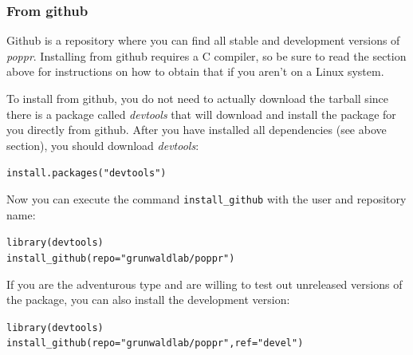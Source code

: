 \documentclass[letterpaper]{article}\usepackage[]{graphicx}\usepackage[]{color}
\makeatletter
\newcommand{\hlstr}[1]{\textcolor[rgb]{0.651,0.522,0}{#1}}%
\newcommand{\hlstd}[1]{\textcolor[rgb]{0,0,0}{#1}}%
\newcommand{\hlkwc}[1]{\textcolor[rgb]{0,0.502,0.753}{#1}}%
\newcommand{\hlkwd}[1]{\textcolor[rgb]{0,0.267,0.4}{#1}}%
\newenvironment{kframe}{%
 \def\at@end@of@kframe{}%
 \ifinner\ifhmode%
  \def\at@end@of@kframe{\end{minipage}}%
  \begin{minipage}{\columnwidth}%
 \fi\fi%
 \def\FrameCommand##1{\hskip\@totalleftmargin \hskip-\fboxsep
 \colorbox{shadecolor}{##1}\hskip-\fboxsep
     \hskip-\linewidth \hskip-\@totalleftmargin \hskip\columnwidth}%
 \MakeFramed {\advance\hsize-\width
   \@totalleftmargin\z@ \linewidth\hsize
   \@setminipage}}%
 {\par\unskip\endMakeFramed%
 \at@end@of@kframe}
\newenvironment{knitrout}{}{} %
\newcommand{\tab}{\hspace*{1em}}
\newcommand{\poppr}{\textit{poppr}}
\makeatother
\begin{document}
\subsubsection{From github}
\tab\tab Github is a repository where you can find all stable and development versions of \poppr{}. Installing from github requires a C compiler, so be sure to read the section above for instructions on how to obtain that if you aren't on a Linux system. 

To install from github, you do not need to actually download the tarball since there is a package called \textit{devtools} that will download and install the package for you directly from github. After you have installed all dependencies (see above section), you should download \textit{devtools}:
\begin{knitrout}\footnotesize
{}\color{fgcolor}\begin{kframe}
\begin{alltt}
\hlkwd{install.packages}\hlstd{(}\hlstr{"devtools"}\hlstd{)}
\end{alltt}
\end{kframe}
\end{knitrout}

Now you can execute the command \texttt{install\_github} with the user and repository name:
\begin{knitrout}\footnotesize
{}\color{fgcolor}\begin{kframe}
\begin{alltt}
\hlkwd{library}\hlstd{(devtools)}
\hlkwd{install_github}\hlstd{(}\hlkwc{repo} \hlstd{=} \hlstr{"grunwaldlab/poppr"}\hlstd{)}
\end{alltt}
\end{kframe}
\end{knitrout}


If you are the adventurous type and are willing to test out unreleased versions of the package, you can also install the development version:
\begin{knitrout}\footnotesize
{}\color{fgcolor}\begin{kframe}
\begin{alltt}
\hlkwd{library}\hlstd{(devtools)}
\hlkwd{install_github}\hlstd{(}\hlkwc{repo} \hlstd{=} \hlstr{"grunwaldlab/poppr"}\hlstd{,} \hlkwc{ref} \hlstd{=} \hlstr{"devel"}\hlstd{)}
\end{alltt}
\end{kframe}
\end{knitrout}
\end{document}
